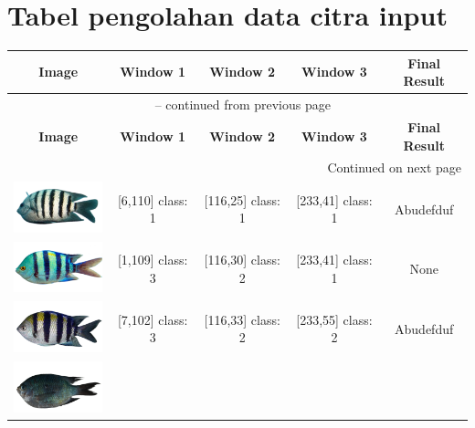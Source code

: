 \appendix




\chapter{Tabel pengolahan data citra input}

\begin{longtable}{|c|c|c|c|c|}
	\hline
	\textbf{Image} & \textbf{Window 1} & \textbf{Window 2} & \textbf{Window 3} & \textbf{Final Result} \\
	\hline
	\endfirsthead
	\multicolumn{5}{c}{{\tablename\ \thetable{} -- continued from previous page}} \\
	\hline
	\textbf{Image} & \textbf{Window 1} & \textbf{Window 2} & \textbf{Window 3} & \textbf{Final Result} \\
	\hline
	\endhead
	\hline \multicolumn{5}{|r|}{{Continued on next page}} \\ \hline
	\endfoot
	\hline
	\endlastfoot
	\includegraphics[width=3cm]{gambar/dataset_validasi/Abudefduf01}
	& [6,110] class: 1 & [116,25] class: 1 & [233,41] class: 1 & Abudefduf \\
	\hline
	\includegraphics[width=3cm]{gambar/dataset_validasi/Abudefduf02}
	& [1,109] class: 3 & [116,30] class: 2 & [233,41] class: 1 & None \\
	\hline
	\includegraphics[width=3cm]{gambar/dataset_validasi/Abudefduf03}
	& [7,102] class: 3 & [116,33] class: 2 & [233,55] class: 2 & Abudefduf \\
	\hline
	\includegraphics[width=3cm]{gambar/dataset_validasi/Abudefduf04}

\end{longtable}
